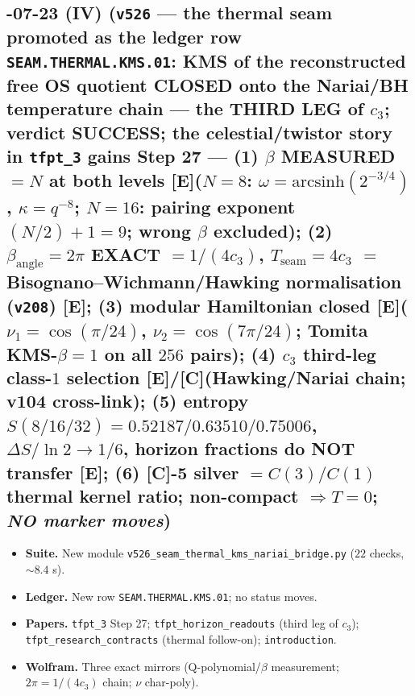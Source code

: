 \documentclass[11pt]{article}
\providecommand{\mE}{\textbf{[E]}}\providecommand{\mC}{\textbf{[C]}}
\providecommand{\vref}[1]{\texttt{#1}}
\begin{document}
\subsection*{-07-23 (IV) (\texttt{v526} --- the thermal seam promoted as the ledger row \texttt{SEAM.THERMAL.KMS.01}: KMS of the reconstructed free OS quotient CLOSED onto the Nariai/BH temperature chain --- the THIRD LEG of $c_3$; verdict SUCCESS; the celestial/twistor story in \texttt{tfpt\_3} gains Step 27 --- (1) $\beta$ MEASURED $=N$ at both levels \mE ($N=8$: $\omega=\mathrm{arcsinh}(2^{-3/4})$, $\kappa=q^{-8}$; $N=16$: pairing exponent $(N/2)+1=9$; wrong $\beta$ excluded); (2) $\beta_{\mathrm{angle}}=2\pi$ EXACT $=1/(4c_3)$, $T_{\mathrm{seam}}=4c_3$ $=$ Bisognano--Wichmann/Hawking normalisation (\vref{v208}) \mE; (3) modular Hamiltonian closed \mE ($\nu_1=\cos(\pi/24)$, $\nu_2=\cos(7\pi/24)$; Tomita KMS-$\beta=1$ on all $256$ pairs); (4) $c_3$ third-leg class-$1$ selection \mE/\mC (Hawking/Nariai chain; v104 cross-link); (5) entropy $S(8/16/32)=0.52187/0.63510/0.75006$, $\Delta S/\ln2\to1/6$, horizon fractions do NOT transfer \mE; (6) \mC-5 silver $=C(3)/C(1)$ thermal kernel ratio; non-compact $\Rightarrow T=0$; \emph{NO marker moves})}
\begin{itemize}[leftmargin=1.5em]
\item \textbf{Suite.} New module \texttt{v526\_seam\_thermal\_kms\_nariai\_bridge.py} ($22$ checks, $\sim8.4$ s).
\item \textbf{Ledger.} New row \texttt{SEAM.THERMAL.KMS.01}; no status moves.
\item \textbf{Papers.} \texttt{tfpt\_3} Step 27; \texttt{tfpt\_horizon\_readouts} (third leg of $c_3$);
\texttt{tfpt\_research\_contracts} (thermal follow-on); \texttt{introduction}.
\item \textbf{Wolfram.} Three exact mirrors (Q-polynomial/$\beta$ measurement; $2\pi=1/(4c_3)$ chain; $\nu$ char-poly).
\end{itemize}
\end{document}

